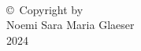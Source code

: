
\thispagestyle{empty}
\hbox{\ }

\vfill

\vspace{.5in}

\begin{center}
\large{\copyright \hbox{ }Copyright by\\
Noemi Sara Maria Glaeser  %
\\
2024}
\end{center}

\vfill

\newpage 
